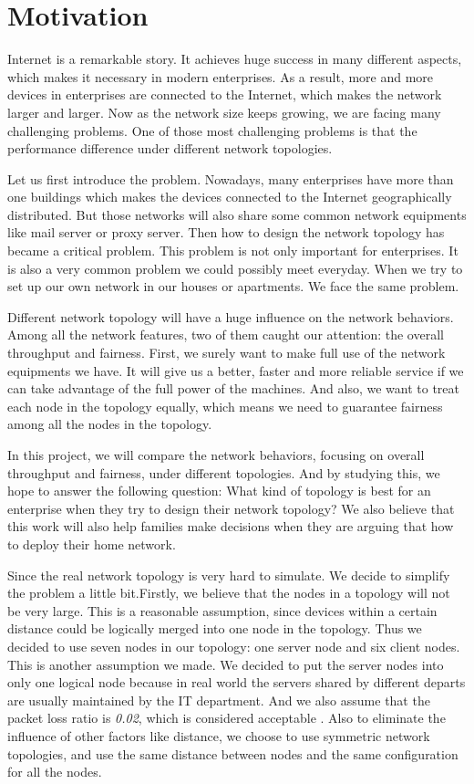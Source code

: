 \section{Motivation} \label{sec:motivation}

Internet is a remarkable story. It achieves huge success in many different aspects, which makes it necessary in modern enterprises.
As a result, more and more devices in enterprises are connected to the Internet, which makes the network larger and larger. Now as the network size keeps growing, we are facing many challenging problems.
One of those most challenging problems is that the performance difference under different network topologies.

Let us first introduce the problem.
Nowadays, many enterprises have more than one buildings which makes the devices connected to the Internet geographically distributed. But those networks will also share some common network equipments like mail server or proxy server. Then how to design the network topology has became a critical problem. This problem is not only important for enterprises. It is also a very common problem we could possibly meet everyday. When we try to set up our own network in our houses or apartments. We face the same problem.

Different network topology will have a huge influence on the network behaviors. Among all the network features, two of them caught our attention: the overall throughput and fairness. First, we surely want to make full use of the network equipments we have. It will give us a better, faster and more reliable service if we can take advantage of the full power of the machines. And also, we want to treat each node in the topology equally, which means we need to guarantee fairness among all the nodes in the topology.
 
In this project, we will compare the network behaviors, focusing on overall throughput and fairness, under different topologies. And by studying this, we hope to answer the following question: What kind of topology is best for an enterprise when they try to design their network topology? We also believe that this work will also help families make decisions when they are arguing that how to deploy their home network.

Since the real network topology is very hard to simulate. We decide to simplify the problem a little bit.Firstly, we believe that the nodes in a topology will not be very large. This is a reasonable assumption, since devices within a certain distance could be logically merged into one node in the topology. Thus we decided to use seven nodes in our topology: one server node and six client nodes. This is another assumption we made. We decided to put the server nodes into only one logical node because in real world the servers shared by different departs are usually maintained by the IT department. And we also assume that the packet loss ratio is \textit{0.02}, which is considered acceptable \cite{PacketLoss:wiki}. Also to eliminate the influence of other factors like distance, we choose to use symmetric network topologies, and use the same distance between nodes and the same configuration for all the nodes.
